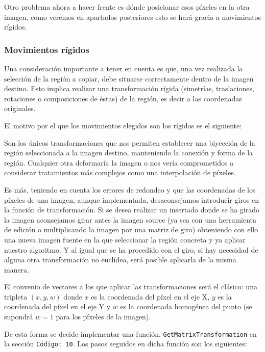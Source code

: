 \documentclass[11pt,twoside,titlepage,a4paper]{article}
\numberwithin{equation}{section} %
\theoremstyle{usual}
\begin{document}
Otro problema ahora a hacer frente es dónde posicionar esos píxeles en la otra imagen, como veremos en apartados posteriores esto se hará gracia a movimientos rígidos.


\subsubsection{Movimientos rígidos} \label{section:movimientosRigidos}

Una consideración importante a tener en cuenta es que, una vez realizada la selección de la región a copiar, debe situarse correctamente dentro de la imagen destino. 
Esto implica realizar una transformación rígida (simetrías, traslaciones, rotaciones o composiciones de éstas) de la región, es decir a las coordenadas originales.   

El motivo por el que los movimientos elegidos son los rígidos es el siguiente: 

Son los únicos transformaciones que nos permiten establecer una biyección de la región seleccionada a la imagen destino, manteniendo la conexión y forma de la región. Cualquier otra deformaría la imagen o nos vería comprometidos a considerar tratamientos más complejos como una interpolación de píxeles.   

Es más, teniendo en cuenta los errores de redondeo y que las coordenadas de los píxeles de una imagen, aunque implementada, desaconsejamos introducir giros en la función de transformación. Si se desea realizar un insertado donde se ha girado la imagen aconsejamos girar antes la imagen source (ya sea con una herramienta de edición o multiplicando la imagen por una matriz de giro) obteniendo con ello una nueva imagen fuente en la que seleccionar la región concreta y ya aplicar nuestro algoritmo.  Y al igual que se ha procedido con el giro, si hay necesidad de alguna otra transformación no euclídea, será posible aplicarla de la misma manera. 

El convenio de vectores a los que aplicar las transformaciones será el clásico:  una tripleta $(x, y, w)$ donde $x$ es la coordenada del píxel en el eje X, $y$ es la coordenada del píxel en el eje Y y $w$ es la coordenada homogénea del punto (se supondrá $w=1$ para los píxeles de la imagen).

De esta forma se decide implementar una función, \texttt{GetMatrixTransformation} en la sección \texttt{Código: 10}. Los pasos seguidos en dicha función son los siguientes:
\end{document}
